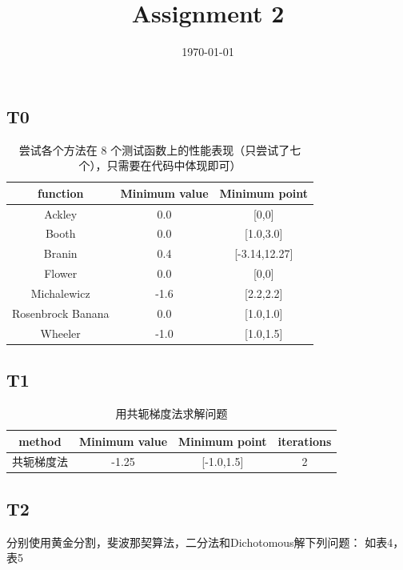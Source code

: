 \documentclass[a4paper]{article}
\date{\today}
\title{Assignment 2}
\begin{document}
    
    \subsection*{T0}

    \begin{table}[h!]
    \centering
    \begin{tabular}{ccc}
        \toprule
        function  & Minimum value  & Minimum point \\
        \midrule
        Ackley & 0.0 & [0,0] \\
        Booth & 0.0 & [1.0,3.0] \\
        Branin & 0.4 & [-3.14,12.27] \\
        Flower &  0.0 & [0,0] \\
        Michalewicz &  -1.6 & [2.2,2.2] \\
        Rosenbrock Banana & 0.0 & [1.0,1.0] \\
        Wheeler & -1.0 &  [1.0,1.5]\\
        \bottomrule
    \end{tabular}
    \caption{尝试各个方法在 8 个测试函数上的性能表现（只尝试了七个），只需要在代码中体现即可）}
    \end{table}
    

    \subsection*{T1}
    
    \begin{table}[h!]
    \centering
    \begin{tabular}{cccc}
        \toprule
        method  & Minimum value & Minimum point & iterations \\
        \midrule
        共轭梯度法 & -1.25 & [-1.0,1.5] &  2 \\
        \bottomrule
    \end{tabular}
    \caption{用共轭梯度法求解问题}
    \end{table}


    \subsection*{T2}

    分别使用黄金分割，斐波那契算法，二分法和Dichotomous解下列问题：
    如表4，表5
    
\end{document}
